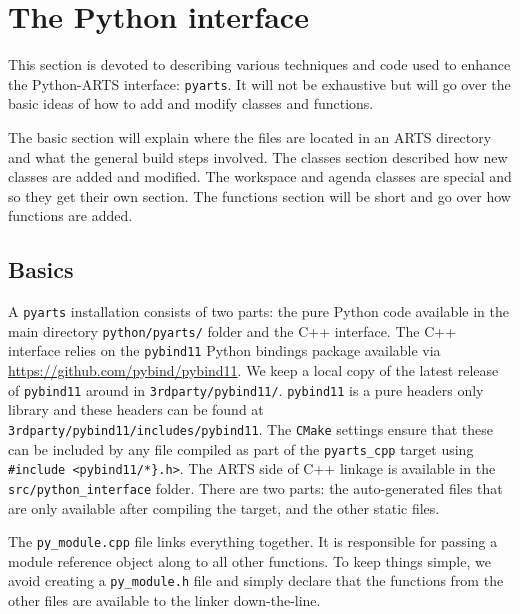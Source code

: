 \chapter{The Python interface}

This section is devoted to describing various techniques and code used to enhance the Python-ARTS interface: \verb|pyarts|.
It will not be exhaustive but will go over the basic ideas of how to add and modify classes and functions.

The basic section will explain where the files are located in an ARTS directory and what the general build steps involved. 
 The classes section described how new classes are added and modified.  
 The workspace and agenda classes are special and so they get their own section.  
 The functions section will be short and go over how functions are added.

\section{Basics}
A \verb|pyarts| installation consists of two parts: the pure Python code available in the main directory \verb|python/pyarts/| folder and the C++ interface.
The C++ interface relies on the \verb|pybind11| Python bindings package available via \url{https://github.com/pybind/pybind11}.
We keep a local copy of the latest release of \verb|pybind11| around in \verb|3rdparty/pybind11/|.
\verb|pybind11| is a pure headers only library and these headers can be found at \verb|3rdparty/pybind11/includes/pybind11|.
The \verb|CMake| settings ensure that these can be included by any file compiled as part of the \verb|pyarts_cpp| target using
\verb|#include <pybind11/*}.h>|.
The ARTS side of C++ linkage is available in the \verb|src/python_interface| folder.  There are two parts: the auto-generated files
that are only available after compiling the target, and the other static files.

The \verb|py_module.cpp| file links everything together.
It is responsible for passing a module reference object along to all other functions.
To keep things simple, we avoid creating a \verb|py_module.h| file and simply declare
that the functions from the other files are available to the linker down-the-line.


